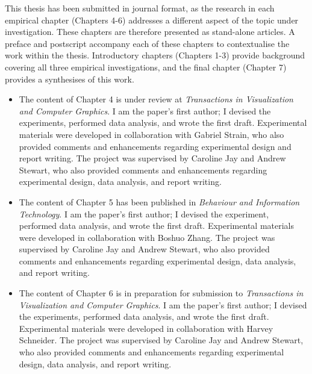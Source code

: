 This thesis has been submitted in journal format, as the research in each empirical chapter (Chapters 4-6) addresses a different aspect of the topic under investigation. These chapters are therefore presented as stand-alone articles. A preface and postscript accompany each of these chapters to contextualise the work within the thesis. Introductory chapters (Chapters 1-3) provide background covering all three empirical investigations, and the final chapter (Chapter 7) provides a synthesises of this work.

\begin{itemize} 
\item The content of Chapter 4 is under review at \textit{Transactions in Visualization and Computer Graphics}. I am the paper’s first author; I devised the experiments, performed data analysis, and wrote the first draft. Experimental materials were developed in collaboration with Gabriel Strain, who also provided comments and enhancements regarding experimental design and report writing. The project was supervised by Caroline Jay and Andrew Stewart, who also provided comments and enhancements regarding experimental design, data analysis, and report writing.
\item The content of Chapter 5 has been published in \textit{Behaviour and Information Technology}. I am the paper’s first author; I devised the experiment, performed data analysis, and wrote the first draft. Experimental materials were developed in collaboration with Boshuo Zhang. The project was supervised by Caroline Jay and Andrew Stewart, who also provided comments and enhancements regarding experimental design, data analysis, and report writing.
\item The content of Chapter 6 is in preparation for submission to \textit{Transactions in Visualization and Computer Graphics}. I am the paper’s first author; I devised the experiments, performed data analysis, and wrote the first draft. Experimental materials were developed in collaboration with Harvey Schneider. The project was supervised by Caroline Jay and Andrew Stewart, who also provided comments and enhancements regarding experimental design, data analysis, and report writing.\\
\end{itemize} 